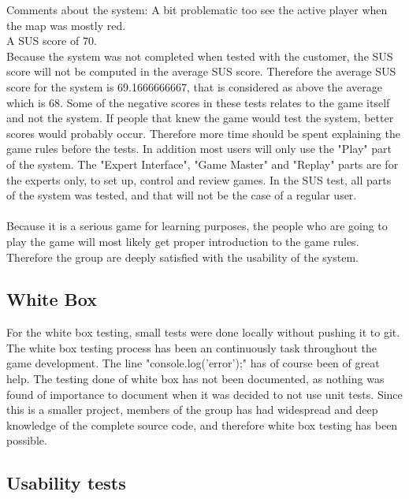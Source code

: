 Comments about the system: A bit problematic too see the active player when the map was mostly red.\\

A SUS score of 70.\\

Because the system was not completed when tested with the customer, the SUS score will not be computed in the average SUS score. Therefore the average SUS score for the system is 69.1666666667, that is considered as above the average which is 68. Some of the negative scores in these tests relates to the game itself and not the system. If people that knew the game would test the system, better scores would probably occur. Therefore more time should be spent explaining the game rules before the tests. In addition most users will only use the "Play" part of the system. The "Expert Interface", "Game Master" and "Replay" parts are for the experts only, to set up, control and review games. In the SUS test, all parts of the system was tested, and that will not be the case of a regular user.\\
\\
Because it is a serious game for learning purposes, the people who are going to play the game will most likely get proper introduction to the game rules. Therefore the group are deeply satisfied with the usability of the system. 
\subsection{White Box}
For the white box testing, small tests were done locally without pushing it to git. The white box testing process has been an continuously task throughout the game development. The line "console.log('error');" has of course been of great help. The testing done of white box has not been documented, as nothing was found of importance to document when it was decided to not use unit tests. Since this is a smaller project, members of the group has had widespread and deep knowledge of the complete source code, and therefore white box testing has been possible.




\subsection{Usability tests}


